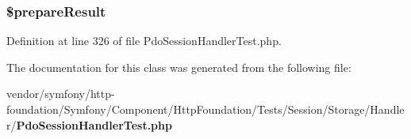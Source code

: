 \subsubsection[{\$prepare\+Result}]{\setlength{\rightskip}{0pt plus 5cm}\$prepare\+Result}\label{class_symfony_1_1_component_1_1_http_foundation_1_1_tests_1_1_session_1_1_storage_1_1_handler_1_1_mock_pdo_a7821cea0af41a9b2ff0259fb3de325f5}


Definition at line 326 of file Pdo\+Session\+Handler\+Test.\+php.



The documentation for this class was generated from the following file\+:\begin{DoxyCompactItemize}
\item 
vendor/symfony/http-\/foundation/\+Symfony/\+Component/\+Http\+Foundation/\+Tests/\+Session/\+Storage/\+Handler/{\bf Pdo\+Session\+Handler\+Test.\+php}\end{DoxyCompactItemize}

